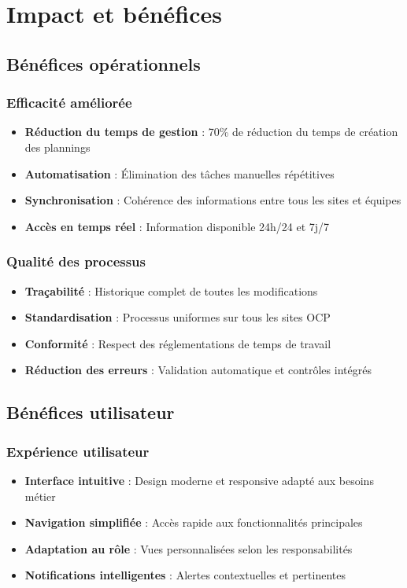 \section{Impact et bénéfices}
\subsection{Bénéfices opérationnels}
\subsubsection{Efficacité améliorée}
\begin{itemize}
    \item \textbf{Réduction du temps de gestion} : 70\% de réduction du temps de création des plannings
    \item \textbf{Automatisation} : Élimination des tâches manuelles répétitives
    \item \textbf{Synchronisation} : Cohérence des informations entre tous les sites et équipes
    \item \textbf{Accès en temps réel} : Information disponible 24h/24 et 7j/7
\end{itemize}

\subsubsection{Qualité des processus}
\begin{itemize}
    \item \textbf{Traçabilité} : Historique complet de toutes les modifications
    \item \textbf{Standardisation} : Processus uniformes sur tous les sites OCP
    \item \textbf{Conformité} : Respect des réglementations de temps de travail
    \item \textbf{Réduction des erreurs} : Validation automatique et contrôles intégrés
\end{itemize}

\subsection{Bénéfices utilisateur}
\subsubsection{Expérience utilisateur}
\begin{itemize}
    \item \textbf{Interface intuitive} : Design moderne et responsive adapté aux besoins métier
    \item \textbf{Navigation simplifiée} : Accès rapide aux fonctionnalités principales
    \item \textbf{Adaptation au rôle} : Vues personnalisées selon les responsabilités
    \item \textbf{Notifications intelligentes} : Alertes contextuelles et pertinentes
\end{itemize}


